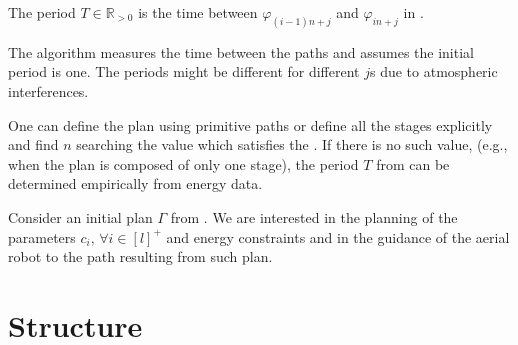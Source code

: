 \begin{highlight}
\begin{defn}[Period]\label{def:period}
  The period $T\in\mathbb{R}_{> 0}$ is the time between $\varphi_{(i-1)n+j}$ and $\varphi_{in+j}$ in .
\end{defn} 
\end{highlight}

The algorithm measures the time between the paths and assumes the initial period is one. The periods might be different for different $j$s due to atmospheric interferences.

One can define the plan using primitive paths or define all the stages explicitly and find $n$ searching the value which satisfies the . If there is no such value, (e.g., when the plan is composed of only one stage), the period $T$ from  can be determined empirically from energy data.

\begin{highlight}
\begin{pb}\label{pb}
  Consider an initial plan $\Gamma$ from . We are interested in the planning of the parameters $c_i,\,\forall i\in[l]^+$ and energy constraints and in the guidance of the aerial robot to the path resulting from such plan.
\end{pb}    
\end{highlight}

\section{\color{red}Structure}
\label{sec:structure}

